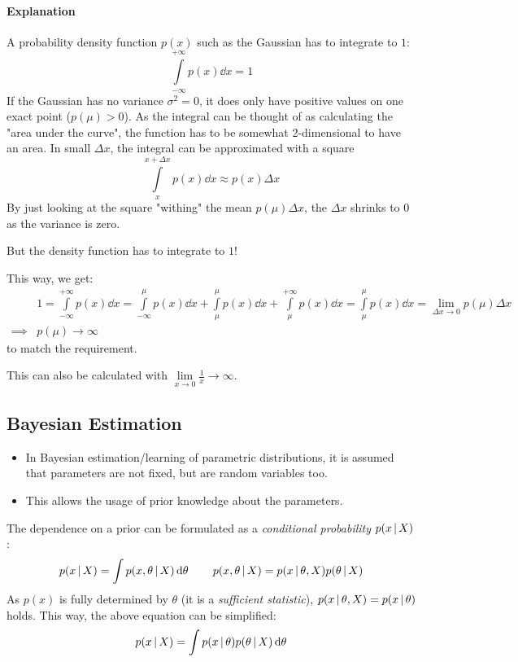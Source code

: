 		\paragraph{Explanation}
			A probability density function \( p(x) \) such as the Gaussian has to integrate to \(1\):
			\begin{equation}
				\int\limits_{-\infty}^{+\infty} p(x) \dd{x} = 1
			\end{equation}
			If the Gaussian has no variance \( \sigma^2 = 0 \), it does only have positive values on one exact point (\( p(\mu) > 0 \)). As the integral can be thought of as calculating the "area under the curve", the function has to be somewhat 2-dimensional to have an area. In small \( \Delta x \), the integral can be approximated with a square
			\begin{equation}
				\int\limits_{x}^{x + \Delta x} p(x) \dd{x} \approx p(x) \Delta x
			\end{equation}
			By just looking at the square "withing" the mean \( p(\mu) \Delta x \), the \(\Delta x\) shrinks to \(0\) as the variance is zero.

			But the density function has to integrate to \(1\)!

			This way, we get:
			\begin{align}
				         & 1 = \int\limits_{-\infty}^{+\infty} p(x) \dd{x} = \int\limits_{-\infty}^\mu p(x) \dd{x} + \int\limits_{\mu}^\mu p(x) \dd{x} + \int\limits_\mu^{+\infty} p(x) \dd{x} = \int\limits_{\mu}^\mu p(x) \dd{x} = \lim\limits_{\Delta x \to 0} p(\mu) \Delta x \\
				\implies & p(\mu) \to \infty
			\end{align}
			to match the requirement.

			This can also be calculated with \( \lim\limits_{x \to 0} \frac{1}{x} \to \infty \).

	\subsection{Bayesian Estimation}
		\begin{itemize}
			\item In Bayesian estimation/learning of parametric distributions, it is assumed that parameters are not fixed, but are random variables too.
			\item This allows the usage of prior knowledge about the parameters.
		\end{itemize}

		The dependence on a prior can be formulated as a \emph{conditional probability} \( p(x \,\vert\, X) \):
		\begin{equation}
			p(x \,\vert\, X) = \int p(x, \theta \,\vert\, X) \dd{\theta} \qquad p(x, \theta \,\vert\, X) = p(x \,\vert\, \theta, X) p(\theta \,\vert\, X)
		\end{equation}
		As \( p(x) \) is fully determined by \(\theta\) (it is a \emph{sufficient statistic}), \( p(x \,\vert\, \theta, X) = p(x \,\vert\, \theta) \) holds. This way, the above equation can be simplified:
		\begin{equation}
			p(x \,\vert\, X) = \int p(x \,\vert\, \theta) p(\theta \,\vert\, X) \dd{\theta}
		\end{equation}

